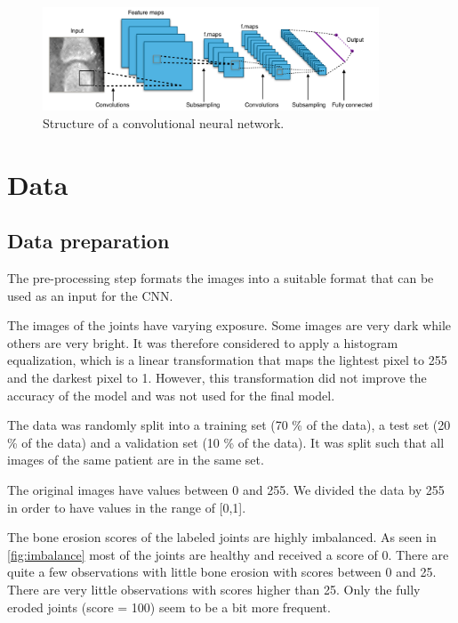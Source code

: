 \documentclass[12pt]{article}
\begin{document}
\begin{figure}[ht]
\includegraphics[width=10cm]{cnn}	
\caption{Structure of a convolutional neural network.}
\label{fig:cnn}
\end{figure}

\newpage
\section{Data}
\label{sec:data}

\subsection{Data preparation}
\label{subsec:data_prep}

The pre-processing step formats the images into a suitable format that can be used as an input for the CNN. 

The images of the joints have varying exposure. Some images are very dark while others are very bright. It was therefore considered to apply a histogram equalization, which is a linear transformation that maps the lightest pixel to 255 and the darkest pixel to 1. However, this transformation did not improve the accuracy of the model and was not used for the final model.

The data was randomly split into a training set (70 \% of the data), a test set (20 \% of the data) and a validation set (10 \% of the data). It was split such that all images of the same patient are in the same set.

The original images have values between 0 and 255. We divided the data by 255 in order to have values in the range of [0,1].

The bone erosion scores of the labeled joints are highly imbalanced. As seen in \autoref{fig:imbalance} most of the joints are healthy and received a score of 0. There are quite a few observations with little bone erosion with scores between 0 and 25. There are very little observations with scores higher than 25. Only the fully eroded joints (score = 100) seem to be a bit more frequent.
\end{document}
